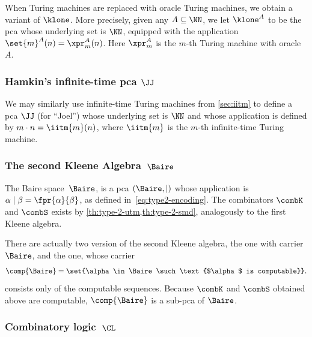 When Turing machines are replaced with oracle Turing machines, we obtain a variant of $\klone$. More precisely, given any $A \subseteq \NN$, we let $\klone^A$ to be the pca whose underlying set is $\NN$, equipped with the application $\set{m}^A(n) = \xpr^A_m(n)$. Here $\xpr^A_m$ is the $m$-th Turing machine with oracle~$A$.

\subsubsection[\texorpdfstring%
{Hamkin's intfinite-time pca $\JJ$}%
{Hamkin's infinite-time pca $\JJ$}%
]{Hamkin's infinite-time pca $\JJ$}
\label{sec:hamkins-pca-oracle}%

We may similarly use infinite-time Turing machines from \cref{sec:iitm} to define a pca $\JJ$ (for ``Joel'') whose underlying set is $\NN$ and whose application is defined by $m \cdot n = \iitm{m}(n)$, where $\iitm{m}$ is the $m$-th infinite-time Turing machine.


\subsubsection[\texorpdfstring%
{The second Kleene Algebra $\Baire$}%
{The second Kleene Algebra B}%
]{The second Kleene Algebra~$\Baire$}
\label{sec:second-kleene-pca}

The Baire space~$\Baire$, is a pca $(\Baire, {\mid})$ whose application is $\alpha \mid \beta = \fpr{\alpha}{\beta}$, as defined in~\eqref{eq:type2-encoding}. The combinators $\combK$ and $\combS$ exists by \cref{th:type-2-utm,th:type-2-smd}, analogously to the first Kleene algebra.

There are actually two version of the second Kleene algebra, the  one
with carrier~$\Baire$, and the  one, whose carrier
%
\begin{equation*}
  \comp{\Baire} = \set{\alpha \in \Baire \such \text{$\alpha$ is computable}}.
\end{equation*}
%
consists only of the computable sequences. Because $\combK$ and $\combS$ obtained above are computable, $\comp{\Baire}$ is a sub-pca of $\Baire$.

\subsubsection{Combinatory logic~$\CL$}
\label{sec:combinatory-logic-pca}

